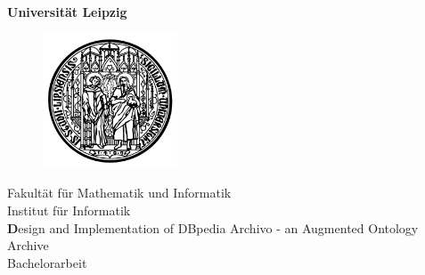 \begin{titlepage}
\newcommand{\titleOfThesis}{Design and Implementation of DBpedia Archivo - an Augmented Ontology Archive}
\newcommand{\kindOfThesis}{Bachelorarbeit} %

\newcommand{\myuniversity}{Universität Leipzig}
\newcommand{\myuni}{Universität Leipzig} %
\newcommand{\myunistreet}{Augustusplatz 10}
\newcommand{\myunizipcity}{04109 Leipzig, Germany}
\newcommand{\myschool}{Fakultät für Mathematik und Informatik}  %
\newcommand{\mydepartment}{Institut für Informatik}
\newcommand{\myfirstname}{Denis}
\newcommand{\mylastname}{Streitmatter}
\newcommand{\mybirthdate}{30.\ December 1997}
\newcommand{\mybirthplace}{Kösching}

\newcommand{\mycompany}{Institut für Angewandte Informatik}
\newcommand{\myworkinggroup}{KILT}
\newcommand{\mycompanystreet}{Goerdelerring 9}
\newcommand{\mycompanyzipcity}{04109 Leipzig, Germany}


\newcommand{\mydegree}{B.\ Sc.\ Computer Science}
\newcommand{\myplace}{Leipzig}
\newcommand{\myyear}{2021}
  \begin{center}
  {\LARGE \textbf{\myuniversity}}\\[5mm]
\begin{figure}[h]
\hbox{}\hfill
\begin{minipage}[t]{9cm}
    		 \centering
    		 \includegraphics[width=4cm]{logos/uni-leipzig-logo.png}
\end{minipage}
\hfill\hbox{}
\end{figure}
  {\Large \myschool}\\
  {\large \mydepartment}\\[20mm]
		{\Large\textbf \titleOfThesis}\\[10mm]
    {\LARGE \kindOfThesis}\\[10mm]
  

\end{center}
\end{titlepage}
